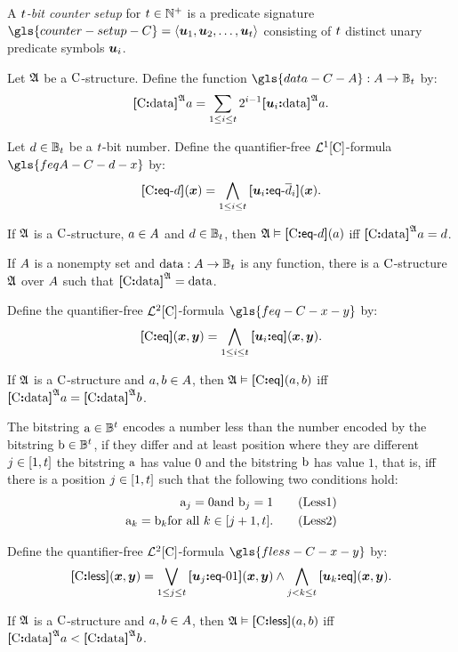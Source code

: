 A \emph{$t$-bit counter setup} for $t \in \mathbb{N}^{+}$ is a predicate
signature $\gls{counter-setup-C} = \seq{\suu1, \suu2, \dots, \suu\tbit}$
consisting of $t$ distinct unary predicate symbols $\bm{u}_{i}$.

\begin{definition}
Let $\mathfrak{A}$ be a ${\mathrm{C}}$-structure. Define the function
$\gls{data-C-A} : \domA \to \tBitnums\tbit$ by:
\[
  {\bm{[}{\mathrm{C}}\mathord{\bm{:}}\mathrm{data}\bm{]}}^{\mathfrak{A}}a = \sum_{1 \leq i \leq t} 2^{i-1} 
  {\bm{[}\bm{u}_{i}\mathord{\bm{:}}\mathrm{data}\bm{]}}^{\mathfrak{A}}a.
\]
\end{definition}
\begin{definition}
Let $d \in \mathbb{B}_{t}$ be a $t$-bit number. Define the
quantifier-free $\mathcal{L}^{1}[{\mathrm{C}}]$-formula $\gls{feqA-C-d-x}$ by:
\[
  {\bm{[}{\mathrm{C}}\mathord{\bm{:}}\mathsf{eq}{\hbox{-}}d\bm{]}}(\bm{x}) = \bigwedge_{1 \leq i \leq t}
  {\bm{[}\bm{u}_{i}\mathord{\bm{:}}\mathsf{eq}{\hbox{-}}\overline{d}_i\bm{]}}(\bm{x}).
\]
\end{definition}
If $\mathfrak{A}$ is a ${\mathrm{C}}$-structure, $a \in A$ and $d \in
\mathbb{B}_{t}$, then $\mathfrak{A} \vDash {\bm{[}{\mathrm{C}}\mathord{\bm{:}}\mathsf{eq}{\hbox{-}}d\bm{]}}(a)$ iff ${\bm{[}{\mathrm{C}}\mathord{\bm{:}}\mathrm{data}\bm{]}}^{\mathfrak{A}} a =
d$.

If $A$ is a nonempty set and $\operatorname{data} : A \to \mathbb{B}_{t}$ is any
function, there is a ${\mathrm{C}}$-structure $\mathfrak{A}$ over $A$ such that
${\bm{[}{\mathrm{C}}\mathord{\bm{:}}\mathrm{data}\bm{]}}^{\mathfrak{A}} = \operatorname{data}$.

\begin{definition}
Define the quantifier-free $\mathcal{L}^{2}[{\mathrm{C}}]$-formula $\gls{feq-C-x-y}$ by:
\[
  {\bm{[}{\mathrm{C}}\mathord{\bm{:}}\mathsf{eq}\bm{]}}(\bm{x},\bm{y}) = \bigwedge_{1 \leq i \leq t} {\bm{[}\bm{u}_{i}\mathord{\bm{:}}\mathsf{eq}\bm{]}}(\bm{x},\bm{y}).
\]
\end{definition}
If $\mathfrak{A}$ is a ${\mathrm{C}}$-structure and $a, b \in A$,
then $\mathfrak{A} \vDash {\bm{[}{\mathrm{C}}\mathord{\bm{:}}\mathsf{eq}\bm{]}}(a, b)$ iff ${\bm{[}{\mathrm{C}}\mathord{\bm{:}}\mathrm{data}\bm{]}}^{\mathfrak{A}}a = {\bm{[}{\mathrm{C}}\mathord{\bm{:}}\mathrm{data}\bm{]}}^{\mathfrak{A}}b$.

The bitstring $\mathrm{a} \in \mathbb{B}^{t}$ encodes a number less than the
number encoded by the bitstring $\mathrm{b} \in \mathbb{B}^{t}$, if they differ
and at least position where they are different $j \in [1,t]$ the bitstring
$\mathrm{a}$ has value $0$ and the bitstring $\mathrm{b}$ has value $1$, that is, iff
there is a position $j \in [1,t]$ such that the following two conditions
hold:
\begin{align}
  \bstra_\jj = 0 \text{and } \bstrb_\jj = 1 \tag{Less1}\label{Less1} \\
  \bstra_\kk = \bstrb_\kk \text{for all } \kk \in [\jj+1,\tbit].
  \tag{Less2}\label{Less2}
\end{align}
\begin{definition}
Define the quantifier-free $\mathcal{L}^{2}[{\mathrm{C}}]$-formula $\gls{fless-C-x-y}$ by:
\[
  {\bm{[}{\mathrm{C}}\mathord{\bm{:}}\mathsf{less}\bm{]}}(\bm{x},\bm{y}) = \bigvee_{1 \leq j \leq t} {\bm{[}\bm{u}_{j}\mathord{\bm{:}}\mathsf{eq}{\hbox{-}}01\bm{]}}(\bm{x},\bm{y})
  \land \bigwedge_{j < k \leq t} {\bm{[}\bm{u}_{k}\mathord{\bm{:}}\mathsf{eq}\bm{]}}(\bm{x},\bm{y}).
\]
\end{definition}
If $\mathfrak{A}$ is a ${\mathrm{C}}$-structure and $a, b \in A$,
then $\mathfrak{A} \vDash {\bm{[}{\mathrm{C}}\mathord{\bm{:}}\mathsf{less}\bm{]}}(a, b)$ iff
${\bm{[}{\mathrm{C}}\mathord{\bm{:}}\mathrm{data}\bm{]}}^{\mathfrak{A}}a < {\bm{[}{\mathrm{C}}\mathord{\bm{:}}\mathrm{data}\bm{]}}^{\mathfrak{A}}b$.

